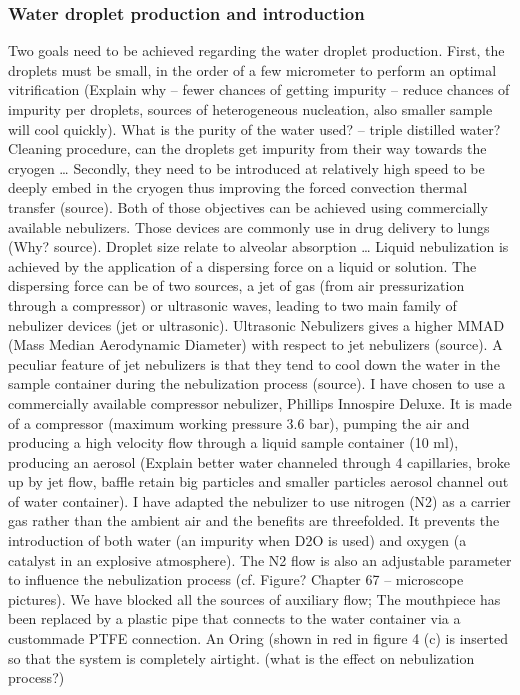 \documentclass[letterpaper,10pt,english]{jupyterBook}
\begin{document}
\subsubsection{Water droplet production and introduction}
\label{\detokenize{Chapter6/Chapter6:water-droplet-production-and-introduction}}
\sphinxAtStartPar
Two goals need to be achieved regarding the water droplet production. First, the droplets must be small, in the order of a few micrometer to perform an optimal vitrification (Explain why – fewer chances of getting impurity – reduce chances of impurity per droplets, sources of heterogeneous nucleation, also smaller sample will cool quickly). What is the purity of the water used? – triple distilled water?
Cleaning procedure, can the droplets get impurity from their way towards the cryogen …
Secondly, they need to be introduced at relatively high speed to be deeply embed in the cryogen thus improving the forced convection thermal transfer (source).
Both of those objectives can be achieved using commercially available nebulizers. Those devices are commonly use in drug delivery to lungs (Why? source). Droplet size relate to alveolar absorption …
Liquid nebulization is achieved by the application of a dispersing force on a liquid or solution. The dispersing force can be of two sources, a jet of gas (from air pressurization through a compressor) or ultrasonic waves, leading to two main family of nebulizer devices (jet or ultrasonic).
Ultrasonic Nebulizers gives a higher MMAD (Mass Median Aerodynamic Diameter) with respect to jet nebulizers (source). A peculiar feature of jet nebulizers is that they tend to cool down the water in the sample container during the nebulization process (source).
I have chosen to use a commercially available compressor nebulizer, Phillips Innospire Deluxe. It is made of a compressor (maximum working pressure 3.6 bar), pumping the air and producing a high velocity flow through a liquid sample container (10 ml), producing an aerosol (Explain better water channeled through 4 capillaries, broke up by jet flow, baffle retain big particles and smaller particles aerosol channel out of water container).
I have adapted the nebulizer to use nitrogen (N2) as a carrier gas rather than the ambient air and the benefits are three\sphinxhyphen{}folded. It prevents the introduction of both water (an impurity when D2O is used) and oxygen (a catalyst in an explosive atmosphere). The N2 flow is also an adjustable parameter to influence the nebulization process (cf. Figure? Chapter 6\sphinxhyphen{}7 – microscope pictures). We have blocked all the sources of auxiliary flow; The mouthpiece has been replaced by a plastic pipe that connects to the water container via a custom\sphinxhyphen{}made PTFE connection. An O\sphinxhyphen{}ring (shown in red in figure 4 (c) is inserted so that the system is completely airtight. (what is the effect on nebulization process?)
\end{document}
